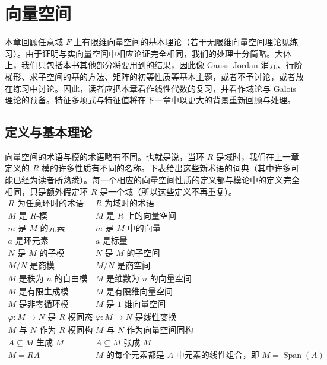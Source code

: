 \chapter{向量空间}

本章回顾任意域 $F$ 上有限维向量空间的基本理论（若干无限维向量空间理论见练习）。由于证明与实向量空间中相应论证完全相同，我们的处理十分简略。大体上，我们只包括本书其他部分将要用到的结果，因此像 Gauss--Jordan 消元、行阶梯形、求子空间的基的方法、矩阵的初等性质等基本主题，或者不予讨论，或者放在练习中讨论。因此，读者应把本章看作线性代数的复习，并看作域论与 Galois 理论的预备。特征多项式与特征值将在下一章中以更大的背景重新回顾与处理。

\section{定义与基本理论}

向量空间的术语与模的术语略有不同。也就是说，当环 $R$ 是域时，我们在上一章定义的 $R$-模的许多性质有不同的名称。下表给出这些新术语的词典（其中许多可能已经为读者所熟悉）。每一个相应的向量空间性质的定义都与模论中的定义完全相同，只是额外假定环 $R$ 是一个域（所以这些定义不再重复）。
\[
\begin{array}{c|c}
\text{$R$ 为任意环时的术语} & \text{$R$ 为域时的术语}\\ \hline
M\text{ 是 }R\text{-模} & M\text{ 是 }R\text{ 上的向量空间}\\
m\text{ 是 }M\text{ 的元素} & m\text{ 是 }M\text{ 中的向量}\\
a\text{ 是环元素} & a\text{ 是标量}\\
N\text{ 是 }M\text{ 的子模} & N\text{ 是 }M\text{ 的子空间}\\
M/N\text{ 是商模} & M/N\text{ 是商空间}\\
M\text{ 是秩为 }n\text{ 的自由模} & M\text{ 是维数为 }n\text{ 的向量空间}\\
M\text{ 是有限生成模} & M\text{ 是有限维向量空间}\\
M\text{ 是非零循环模} & M\text{ 是 }1\text{ 维向量空间}\\
\varphi:M\to N\text{ 是 }R\text{-模同态} & \varphi:M\to N\text{ 是线性变换}\\
M\text{ 与 }N\text{ 作为 }R\text{-模同构} & M\text{ 与 }N\text{ 作为向量空间同构}\\
A\subseteq M\text{ 生成 }M & A\subseteq M\text{ 张成 }M\\
M=RA & M\text{ 的每个元素都是 }A\text{ 中元素的线性组合，即 }M=\operatorname{Span}(A)
\end{array}
\]


